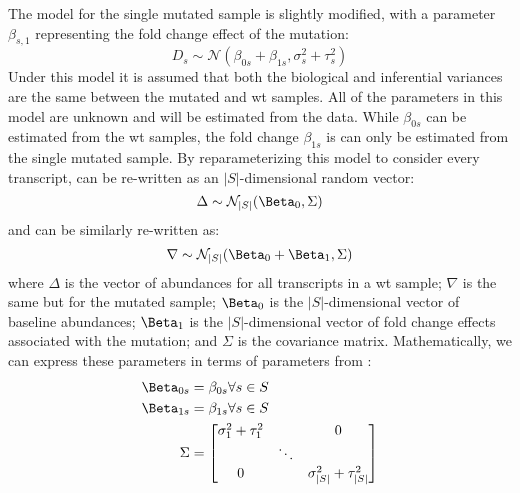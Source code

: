The model for the single mutated sample is slightly modified, with a parameter $\beta_{s,1}$ representing the fold change effect of the mutation:
%
\begin{equation}
  D_s \sim \mathcal{N} \left( \beta_{0s} + \beta_{1s}, \sigma_s^2 + \tau_s^2 \right)
  \label{eqn:single_mut_model}
\end{equation}
%
Under this model it is assumed that both the biological and inferential variances are the same between the mutated and \gls{wt} samples.
All of the parameters in this model are unknown and will be estimated from the data.
While $\beta_{0s}$ can be estimated from the \gls{wt} samples, the fold change $\beta_{1s}$ is can only be estimated from the single mutated sample.
By reparameterizing this model to consider every transcript,  can be re-written as an $|S|$-dimensional random vector:
%
\begin{equation}
  \Delta \sim \mathcal{N}_{|S|}(\Beta_0, \Sigma) \\
  \label{eqn:delta_wt}
\end{equation}
%
and  can be similarly re-written as:
%
\begin{equation}
  \nabla \sim \mathcal{N}_{|S|}(\Beta_0 + \Beta_1, \Sigma) \\
  \label{eqn:delta_mut}
\end{equation}
%
where $\Delta$ is the vector of abundances for all transcripts in a \gls{wt} sample; $\nabla$ is the same but for the mutated sample; $\Beta_0$ is the $|S|$-dimensional vector of baseline abundances; $\Beta_1$ is the $|S|$-dimensional vector of fold change effects associated with the mutation; and $\Sigma$ is the covariance matrix.
Mathematically, we can express these parameters in terms of parameters from :
%
\begin{align*}
  \Beta_{0s} & = \beta_{0s} \forall s \in S \\
  \Beta_{1s} & = \beta_{1s} \forall s \in S \\
  \Sigma     & = \begin{bmatrix}
    \sigma_1^2 + \tau_1^2 &        & 0                             \\
                          & \ddots                                 \\
    0                     &        & \sigma_{|S|}^2 + \tau_{|S|}^2 \\
  \end{bmatrix}
\end{align*}

